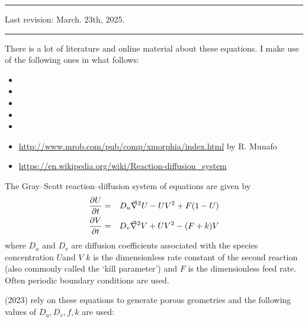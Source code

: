 \par\noindent\rule{\textwidth}{0.4pt}

Last revision: March. 23th, 2025.

\par\noindent\rule{\textwidth}{0.4pt}


There is a lot of literature and online material about these equations. I make use of the following 
ones in what follows:
\begin{itemize}
\item {}
\item {}
\item {}
\item {}
\item {}
\item \url{http://www.mrob.com/pub/comp/xmorphia/index.html} by R. Munafo
\item \url{https://en.wikipedia.org/wiki/Reaction-diffusion_system}
\end{itemize}

The Gray–Scott reaction–diffusion system of equations are given by
\begin{eqnarray}
\frac{\partial U}{\partial t} &=& D_u \vec\nabla^2 U - UV^2 + F(1-U) \nonumber\\
\frac{\partial V}{\partial t} &=& D_v \vec\nabla^2 V + UV^2 - (F+k)V 
\end{eqnarray}
where $D_u$ and $D_v$ are diffusion coefficients associated with the species concentration $U$and $V$
$k$ is the dimensionless rate constant of the second reaction (also commonly called the `kill 
parameter') and $F$ is the dimensionless feed rate.
Often periodic boundary conditions are used. 

\textcite{gama23} (2023) rely on these equations to generate porous geometries 
and the following values of $D_u,D_v,f,k$ are used:

